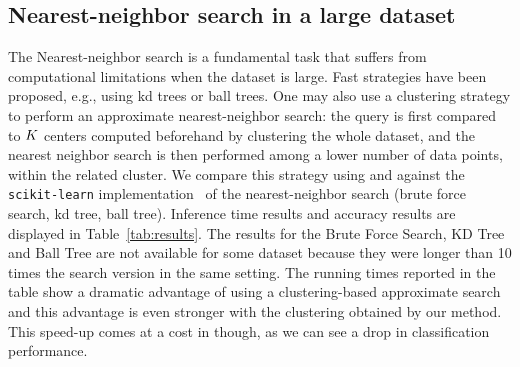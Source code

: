 \subsection{Nearest-neighbor search in a large dataset}
The Nearest-neighbor search is a fundamental task that suffers from computational limitations when the dataset is large.
Fast strategies have been proposed, e.g., using kd trees or ball trees.
One may also use a clustering strategy to perform an approximate nearest-neighbor search: the query is first compared to $K$ centers computed beforehand by clustering the whole dataset, and the nearest neighbor search is then performed among a lower number of data points, within the related cluster.
We compare this strategy using \kmeans and \qkmeans against the \texttt{scikit-learn} implementation~\cite{Pedregosa2011Scikit} of the nearest-neighbor search (brute force search, kd tree, ball tree).
Inference time results and accuracy results are displayed in Table~\ref{tab:results}. 
The results for the Brute Force Search, KD Tree and Ball Tree are not available for some dataset because they were longer than 10 times the \kmeans search version in the same setting.
The running times reported in the table show a dramatic advantage of using a clustering-based approximate search 
and this advantage is even stronger with the clustering obtained by our \qkmeans method. This speed-up comes at a cost in though, as we can see a drop in classification performance. 
% 



